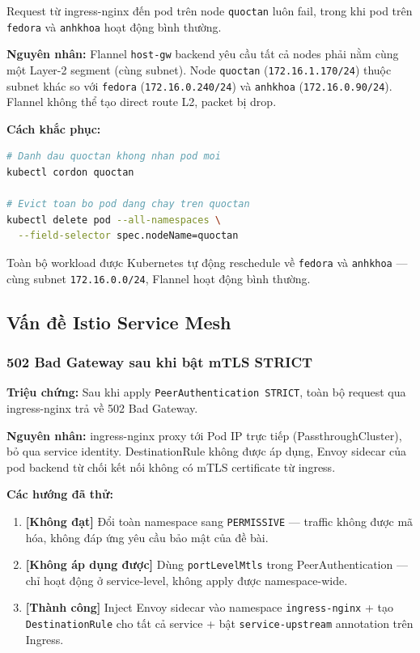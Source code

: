 Request từ ingress-nginx đến pod trên node \texttt{quoctan} luôn fail, trong khi pod trên \texttt{fedora} và \texttt{anhkhoa} hoạt động bình thường.

\textbf{Nguyên nhân:} Flannel \texttt{host-gw} backend yêu cầu tất cả nodes phải nằm cùng một Layer-2 segment (cùng subnet). Node \texttt{quoctan} (\texttt{172.16.1.170/24}) thuộc subnet khác so với \texttt{fedora} (\texttt{172.16.0.240/24}) và \texttt{anhkhoa} (\texttt{172.16.0.90/24}). Flannel không thể tạo direct route L2, packet bị drop.

\textbf{Cách khắc phục:}

\begin{lstlisting}[language=bash]
# Danh dau quoctan khong nhan pod moi
kubectl cordon quoctan

# Evict toan bo pod dang chay tren quoctan
kubectl delete pod --all-namespaces \
  --field-selector spec.nodeName=quoctan
\end{lstlisting}

Toàn bộ workload được Kubernetes tự động reschedule về \texttt{fedora} và \texttt{anhkhoa} — cùng subnet \texttt{172.16.0.0/24}, Flannel hoạt động bình thường.

\subsection{Vấn đề Istio Service Mesh}

\subsubsection{502 Bad Gateway sau khi bật mTLS STRICT}

\textbf{Triệu chứng:} Sau khi apply \texttt{PeerAuthentication STRICT}, toàn bộ request qua ingress-nginx trả về 502 Bad Gateway.

\textbf{Nguyên nhân:} ingress-nginx proxy tới Pod IP trực tiếp (PassthroughCluster), bỏ qua service identity. DestinationRule không được áp dụng, Envoy sidecar của pod backend từ chối kết nối không có mTLS certificate từ ingress.

\textbf{Các hướng đã thử:}
\begin{enumerate}
  \item \textbf{[Không đạt]} Đổi toàn namespace sang \texttt{PERMISSIVE} --- traffic không được mã hóa, không đáp ứng yêu cầu bảo mật của đề bài.

  \item \textbf{[Không áp dụng được]} Dùng \texttt{portLevelMtls} trong PeerAuthentication --- chỉ hoạt động ở service-level, không apply được namespace-wide.

  \item \textbf{[Thành công]} Inject Envoy sidecar vào namespace \texttt{ingress-nginx} + tạo \texttt{DestinationRule} cho tất cả service + bật \texttt{service-upstream} annotation trên Ingress.
\end{enumerate}

